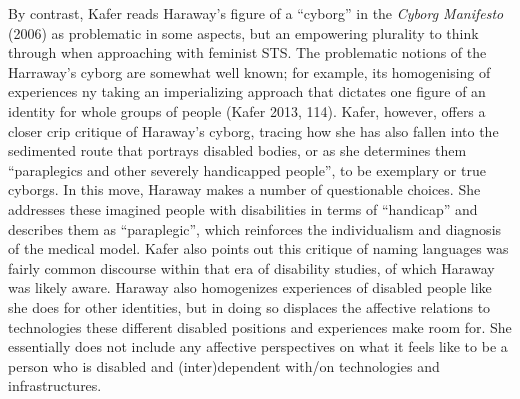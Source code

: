 By contrast, Kafer reads Haraway's figure of a ``cyborg'' in the
\emph{Cyborg Manifesto} (2006) as problematic in some aspects, but an
empowering plurality to think through when approaching with feminist
STS. The problematic notions of the Harraway's cyborg are somewhat well
known; for example, its homogenising of experiences ny taking an
imperializing approach that dictates one figure of an identity for whole
groups of people (Kafer 2013, 114). Kafer, however, offers a closer crip
critique of Haraway's cyborg, tracing how she has also fallen into the
sedimented route that portrays disabled bodies, or as she determines
them ``paraplegics and other severely handicapped people'', to be
exemplary or true cyborgs. In this move, Haraway makes a number of
questionable choices. She addresses these imagined people with
disabilities in terms of ``handicap'' and describes them as
``paraplegic'', which reinforces the individualism and diagnosis of the
medical model. Kafer also points out this critique of naming languages
was fairly common discourse within that era of disability studies, of
which Haraway was likely aware. Haraway also homogenizes experiences of
disabled people like she does for other identities, but in doing so
displaces the affective relations to technologies these different
disabled positions and experiences make room for. She essentially does
not include any affective perspectives on what it feels like to be a
person who is disabled and (inter)dependent with/on technologies and
infrastructures.

